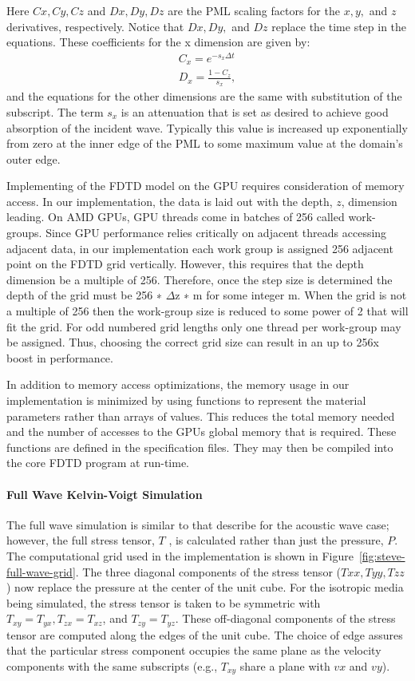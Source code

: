 Here $Cx, Cy, Cz$ and $Dx, Dy, Dz$ are the PML scaling factors for the $x, y,$
and $z$ derivatives, respectively. Notice that $Dx, Dy,$ and $Dz$ replace the
time step in the equations. These coefficients for the x dimension are given
by:
\begin{align*}
    C_x = e^{-s_x \Delta t}\\
    D_x = \frac{1-C_z}{s_x},
\end{align*}
and the equations for the other dimensions are the same with substitution of
the subscript. The term $s_x$ is an attenuation that is set as desired to
achieve good absorption of the incident wave. Typically this value is increased up
exponentially from zero at the inner edge of the PML to some maximum value at
the domain’s outer edge.

Implementing of the FDTD model on the GPU requires consideration of memory
access.  In our implementation, the data is laid out with the depth, $z$,
dimension leading. On AMD GPUs, GPU threads come in batches of 256 called
work-groups.  Since GPU performance relies critically on adjacent threads
accessing adjacent data, in our implementation each work group is assigned 256
adjacent point on the FDTD grid vertically. However, this requires that the
depth dimension be a multiple of 256. Therefore, once the step size is
determined the depth of the grid must be 256 ∗ $\Delta$z ∗ m for some integer
m. When the grid is not a multiple of 256 then the work-group size is reduced
to some power of 2 that will fit the grid. For odd numbered grid lengths only
one thread per work-group may be assigned. Thus, choosing the correct grid size
can result in an up to 256x boost in performance. 

In addition to memory access optimizations, the memory usage in our
implementation is minimized by using functions to represent the material
parameters rather than arrays of values. This reduces the total memory needed
and the number of accesses to the GPUs global memory that is required. These
functions are defined in the specification files. They may then be compiled
into the core FDTD program at run-time. 

\paragraph{Full Wave Kelvin-Voigt Simulation}
The full wave simulation is similar to that describe for the acoustic wave
case; however, the full stress tensor, $T$ , is calculated rather than just the
pressure, $P$. The computational grid used in the implementation is shown in
Figure~\ref{fig:steve-full-wave-grid}. The three diagonal components of the
stress tensor ($Txx, Tyy, Tzz$) now replace the pressure at the center of the
unit cube. For the isotropic media being simulated, the stress tensor is taken
to be symmetric with $T_{xy} = T_{yx}, T_{zx} = T_{xz}$, and $T_{zy} = T_{yz}$.
These off-diagonal components of the stress tensor are computed along the edges
of the unit cube.  The choice of edge assures that the particular stress
component occupies the same plane as the velocity components with the same
subscripts (e.g., $T_{xy}$ share a plane with $vx$ and $vy$). 

